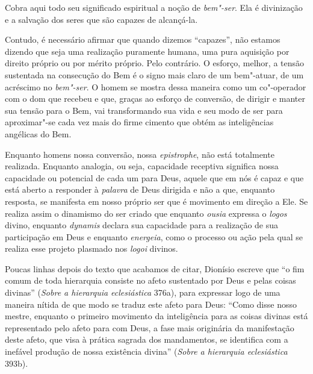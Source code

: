 Cobra aqui todo seu significado espiritual a noção de \textit{bem"-ser}.  Ela é
divinização e a salvação dos seres que são capazes de alcançá-la. 

Contudo, é necessário afirmar que quando dizemos  ``capazes'', não estamos
dizendo que seja uma realização puramente humana, uma pura aquisição por direito
próprio ou por mérito próprio. Pelo contrário. O esforço, melhor, a tensão
sustentada na consecução do Bem é o signo mais claro de um bem"-atuar, de um
acréscimo no \textit{bem"-ser}. O homem se mostra dessa maneira como um
co"-operador com o dom que recebeu e que, graças ao esforço de conversão, de
dirigir e manter sua tensão para o Bem, vai transformando sua vida e seu modo de
ser para aproximar"-se cada vez mais do firme cimento que obtém as inteligências
angélicas do Bem.

Enquanto homens nossa conversão, nossa \textit{epistrophe}, não está totalmente
realizada. Enquanto analogia, ou seja, capacidade receptiva significa nossa
capacidade ou potencial de cada um para Deus, aquele que em nós é capaz e que
está aberto a responder à \textit{palavra} de Deus dirigida e não a que,
enquanto resposta, se manifesta em nosso próprio ser que é movimento em direção
a Ele. Se realiza assim o dinamismo do ser criado que enquanto \textit{ousia}
expressa o \textit{logos} divino, enquanto \textit{dynamis} declara sua
capacidade para a realização de sua participação em Deus e enquanto
\textit{energeia}, como o processo ou ação pela qual se realiza esse projeto
plasmado nos \textit{logoi} divinos.

Poucas linhas depois do texto que acabamos de citar, Dionísio escreve que ``o
fim comum de toda hierarquia consiste no afeto sustentado por Deus e pelas
coisas divinas'' (\textit{Sobre a hierarquia eclesiástica} 376a), para expressar
logo de uma maneira nítida de que modo se traduz este afeto para Deus:
``Como disse nosso mestre, enquanto o primeiro movimento da inteligência para as
coisas divinas está representado pelo afeto para com Deus, a fase mais
originária da manifestação deste afeto, que visa à prática sagrada dos
mandamentos, se identifica com a inefável produção de nossa existência divina'' 
(\textit{Sobre a hierarquia eclesiástica} 393b). 

